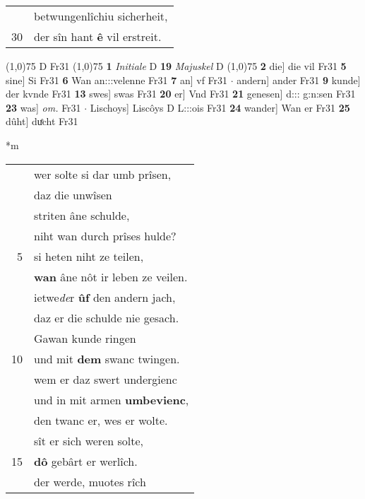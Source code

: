 \documentclass[8pt,a4paper,notitlepage]{article}
\begin{document}
\begin{table}[ht]
\begin{minipage}[t]{0.5\linewidth}
\begin{tabular}{rl}
 & betwungenlîchiu sicherheit,\\ 
30 & der sîn hant \textbf{ê} vil erstreit.\\ 
\end{tabular}
\scriptsize
\line(1,0){75} \newline
D Fr31 \newline
\line(1,0){75} \newline
\textbf{1} \textit{Initiale} D  \textbf{19} \textit{Majuskel} D  \newline
\line(1,0){75} \newline
\textbf{2} die] die vil Fr31 \textbf{5} sine] Si Fr31 \textbf{6} Wan an:::velenne Fr31 \textbf{7} an] vf Fr31  $\cdot$ andern] ander Fr31 \textbf{9} kunde] der kvnde Fr31 \textbf{13} swes] swas Fr31 \textbf{20} er] Vnd Fr31 \textbf{21} genesen] d::: g:n:sen Fr31 \textbf{23} was] \textit{om.} Fr31  $\cdot$ Lischoys] Liscôys D L:::ois Fr31 \textbf{24} wander] Wan er Fr31 \textbf{25} dûht] duͤcht Fr31 \newline
\end{minipage}
\hspace{0.5cm}
\begin{minipage}[t]{0.5\linewidth}
\small
\begin{center}*m
\end{center}
\begin{tabular}{rl}
 & wer solte si dar umb prîsen,\\ 
 & daz die unwîsen\\ 
 & striten âne schulde,\\ 
 & niht wan durch prîses hulde?\\ 
5 & si heten niht ze teilen,\\ 
 & \textbf{wan} âne nôt ir leben ze veilen.\\ 
 & ietwe\textit{de}r \textbf{ûf} den andern jach,\\ 
 & daz er die schulde nie gesach.\\ 
 & Gawan kunde ringen\\ 
10 & und mit \textbf{dem} swanc twingen.\\ 
 & wem er daz swert undergienc\\ 
 & und in mit armen \textbf{umbevienc},\\ 
 & den twanc er, wes er wolte.\\ 
 & sît er sich weren solte,\\ 
15 & \textbf{dô} gebârt er werlîch.\\ 
 & der werde, muotes rîch\\ 

\end{tabular}
\end{minipage}
\end{table}
\end{document}
